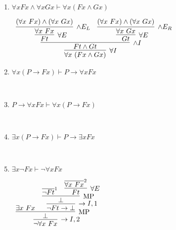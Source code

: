 \documentclass[11pt]{report}
\newcommand{\temp}[2]{{\overline{#2}}^{#1}}
\begin{document}
\begin{enumerate}
\begin{enumerate}
			\item $\forall x Fx\land \forall x Gx \vdash \forall x (Fx\land Gx)$
			
			\begin{center}
				$\begin{array}{c}
					\infer[\forall I]{\forall x \ (Fx \land Gx)}
						{\infer[\land I]{Ft \land Gt}
							{\infer[\forall E]{Ft}
								{\infer[\land E_{L}]{\forall x \ Fx}
									{(\forall x \ Fx) \land (\forall x \ Gx)}}
							&
							\infer[\forall E]{Gt}
								{\infer[\land E_{R}]{\forall x \ Gx}
									{(\forall x \ Fx) \land (\forall x \ Gx)}}}}
				\end{array}$
			\end{center}
			\newpage
			\item $\forall x (P \to Fx) \vdash  P \to \forall x Fx$
			
			\begin{center}
				$\begin{array}{c}
					\infer[]{}
						{}					
				\end{array}$
			\end{center}

			\item $P \to \forall x Fx \vdash \forall x (P \to Fx)$
			
			\begin{center}
				$\begin{array}{c}
					\infer[]{}
						{}					
				\end{array}$
			\end{center}
			
			\item $\exists x (P \to Fx) \vdash  P \to \exists x Fx$
			
			\begin{center}
				$\begin{array}{c}
					\infer[]{}
						{}					
				\end{array}$
			\end{center}
			
			\item $\exists x \neg Fx \vdash  \neg  \forall x Fx$
			
			\begin{center}
				$\begin{array}{c}
					\infer[\to I,2]{\lnot \forall x \ Fx}
						{\infer[\MP]{\bot}
							{\exists x \ Fx
							&
							\infer[\to I,1]{\lnot Ft \to \bot}
								{\infer[\MP]{\bot}
									{\temp{1}{\lnot Ft}
									&
									\infer[\forall E]{Ft}
										{\temp{2}{\forall x \ Fx}}}}}}
				\end{array}$
			\end{center}
			

\end{enumerate}
\end{enumerate}
\end{document}
